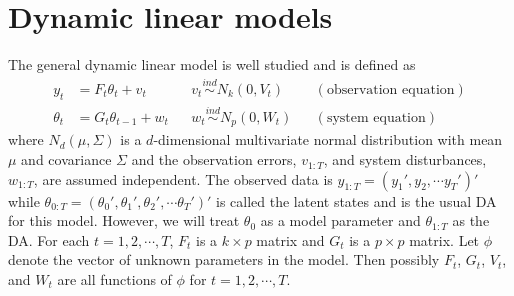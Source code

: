 \documentclass{article}
\begin{document}
\section{Dynamic linear models} \label{sec:DLM} 

The general dynamic linear model is well studied \cite{harrison1999bayesian,petris2009dynamic,prado2010time} and is defined as
\begin{align}
y_t &= F_t\theta_t + v_t && v_t \stackrel{ind}{\sim} N_k(0,V_t) && (\mbox{observation equation}) \label{dlmtdobseq}\\
 \theta_t &= G_t\theta_{t-1} + w_t && w_t \stackrel{ind}{\sim} N_p(0,W_t) && (\mbox{system equation}) \label{dlmtdsyseq}
\end{align}
where $N_d(\mu,\Sigma)$ is a $d$-dimensional multivariate normal distribution with mean $\mu$ and covariance $\Sigma$ and the observation errors, $v_{1:T}$, and system disturbances, $w_{1:T}$, are assumed independent. The observed data is $y_{1:T} = (y_1',y_2,\cdots y_T')'$ while $\theta_{0:T}=(\theta_0',\theta_1',\theta_2',\cdots \theta_T')'$ is called the latent states and is the usual DA for this model. However, we will treat $\theta_0$ as a model parameter and $\theta_{1:T}$ as the DA. For each $t=1,2,\cdots,T$, $F_t$ is a $k\times p$ matrix and $G_t$ is a $p\times p$ matrix. Let $\phi$ denote the vector of unknown parameters in the model. Then possibly $F_{t}$, $G_{t}$, $V_{t}$, and $W_{t}$ are all functions of $\phi$ for $t=1,2,\cdots,T$. 
\end{document}
